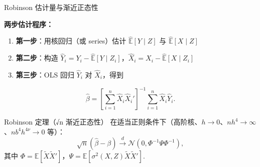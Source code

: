 \documentclass[aspectratio=169, 10pt]{beamer}
\begin{document}
\begin{frame}{Robinson 估计量与渐近正态性}

  \textbf{两步估计程序：}
  \begin{enumerate}\setlength{\itemsep}{1pt}
    \item \textbf{第一步}：用核回归（或 series）估计 $\hat{\mathbb{E}}[Y\mid Z]$ 与 $\hat{\mathbb{E}}[X\mid Z]$
    \item \textbf{第二步}：构造 $\hat Y_i = Y_i - \hat{\mathbb{E}}[Y\mid Z_i]$，$\hat X_i = X_i - \hat{\mathbb{E}}[X\mid Z_i]$
    \item \textbf{第三步}：OLS 回归 $\hat Y_i$ 对 $\hat X_i$，得到
  \end{enumerate}
  $$\hat\beta = \left[\sum_{i=1}^n \hat X_i \hat X_i'\right]^{-1} \sum_{i=1}^n \hat X_i \hat Y_i.$$

  \begin{definitionbox}{{Robinson 定理（√n 渐近正态性）}}
    在适当正则条件下（高阶核、$h \to 0$、$nh^4 \to \infty$、$nb^4 h^{4\nu} \to 0$ 等）：
    $$\sqrt{n}(\hat\beta - \beta) \overset{d}{\to} \mathcal{N}(0, \Phi^{-1}\Psi\Phi^{-1}),$$
    其中 $\Phi = \mathbb{E}[\tilde X \tilde X']$，$\Psi = \mathbb{E}[\sigma^2(X,Z) \tilde X \tilde X']$.
  \end{definitionbox}

  \hypertarget{main-c2}{}
  \hfill{\scriptsize\hyperlink{proof-c2}{}}

\end{frame}
\end{document}
